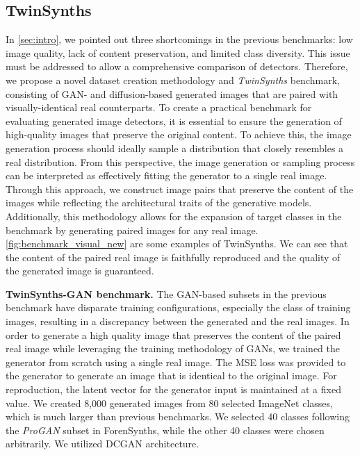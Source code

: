 \subsection{TwinSynths} 
In \cref{sec:intro}, we pointed out three shortcomings in the previous benchmarks: low image quality, lack of content preservation, and limited class diversity.
This issue must be addressed to allow a comprehensive comparison of detectors.
Therefore, we propose a novel dataset creation methodology and \emph{TwinSynths} benchmark, consisting of GAN- and diffusion-based generated images that are  paired with visually-identical real counterparts.
To create a practical benchmark for evaluating generated image detectors, it is essential to ensure the generation of high-quality images that preserve the original content.
To achieve this, the image generation process should ideally sample a distribution that closely resembles a real distribution.
From this perspective, the image generation or sampling process can be interpreted as effectively fitting the generator to a single real image.
Through this approach, we construct image pairs that preserve the content of the images while reflecting the architectural traits of the generative models.
Additionally, this methodology allows for the expansion of target classes in the benchmark by generating paired images for any real image.
\cref{fig:benchmark_visual_new} are some examples of TwinSynths.
We can see that the content of the paired real image is faithfully reproduced and the quality of the generated image is guaranteed.

\textbf{TwinSynths-GAN benchmark.}
The GAN-based subsets in the previous benchmark have disparate training configurations, especially the class of training images, resulting in a discrepancy between the generated and the real images.
In order to generate a high quality image that preserves the content of the paired real image while leveraging the training methodology of GANs, we trained the generator from scratch using a single real image.
The MSE loss was provided to the generator to generate an image that is identical to the original image.
For reproduction, the latent vector for the generator input is maintained at a fixed value.
We created 8,000 generated images from 80 selected ImageNet\cite{russakovsky2015imagenet} classes, which is much larger than previous benchmarks.
We selected 40 classes following the \emph{ProGAN} subset in ForenSynths\cite{wang2020cnn}, while the other 40 classes were chosen arbitrarily. 
We utilized DCGAN \cite{radford2015unsupervised} architecture. 


